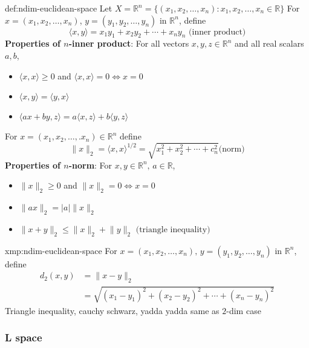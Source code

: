 \documentclass{article}
\begin{document}
\begin{dfn}{def:ndim-euclidean-space}{}
    Let $X = \mathbb{R}^{n} = \{(x_{1},x_{2},\dots,x_{n}) : x_{1},x_{2},\dots,x_{n}\in\mathbb{R}\}$
    \newline
    For $x = (x_{1},x_{2},\dots,x_{n})$, $y=(y_{1},y_{2},\dots,y_{n})$ in $\mathbb{R}^{n}$, define
    \[\langle x,y \rangle = x_{1}y_{1} + x_{2}y_{2} + \cdots + x_{n}y_{n} \text{ (inner product)}\]
    \textbf{Properties of $n$-inner product}: For all vectors $x,y,z\in\mathbb{R}^{n}$ and all real scalars $a,b$,
    \begin{itemize}
        \item $\langle x,x \rangle\ge 0$ and $\langle x,x \rangle=0 \iff x = 0$
        \item $\langle x,y \rangle = \langle y,x \rangle$
        \item $\langle ax+by,z \rangle = a\langle x,z \rangle + b\langle y,z \rangle$
    \end{itemize}
    For $x = (x_{1},x_{2},\dots,.x_{n})\in\mathbb{R}^{n}$ define
    \[\lVert x \rVert_{2} = \langle x,x \rangle^{1/2} = \sqrt{x^{2}_{1} + x^{2}_{2} + \cdots + c^{2}_{n}}\text{(norm)}\]
    \textbf{Properties of $n$-norm}: For $x,y\in\mathbb{R}^{n},\,a\in\mathbb{R}$,
    \begin{itemize}
        \item $\lVert x \rVert_{2}\ge 0$ and $\lVert x \rVert_{2}=0 \iff x = 0$
        \item $\lVert ax \rVert_{2}=\lvert a \rvert\lVert x \rVert_{2}$
        \item $\lVert x+y \rVert_{2}\le \lVert x \rVert_{2} + \lVert y \rVert_{2}\text{ (triangle inequality)}$
    \end{itemize}
\end{dfn}

\begin{xmp}{xmp:ndim-euclidean-space}{}
    For $x = (x_{1},x_{2},\dots,x_{n}),\,y=(y_{1},y_{2},\dots,y_{n})$ in $\mathbb{R}^{n}$, define
    \begin{align*}
        d_{2}(x,y) &= \lVert x - y \rVert_{2} \\
                   &= \sqrt{(x_{1}-y_{1})^{2} + (x_{2}-y_{2})^{2} + \cdots + (x_{n} - y_{n})^{2}}
    \end{align*}
    Triangle inequality, cauchy schwarz, yadda yadda same as $2$-dim case
\end{xmp}

\subsubsection{L space}
\end{document}

